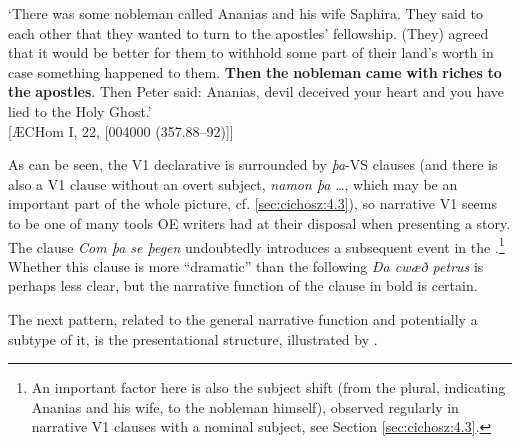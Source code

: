 \documentclass[output=paper,colorlinks,citecolor=brown]{langscibook}
\begin{document}
\glt ‘There was some nobleman called Ananias and his wife Saphira. They said to each other that they wanted to turn to the apostles' fellowship. (They) agreed that it would be better for them to withhold some part of their land's worth in case something happened to them. \textbf{Then} \textbf{the} \textbf{nobleman} \textbf{came} \textbf{with} \textbf{riches} \textbf{to} \textbf{the} \textbf{apostles}. Then Peter said: Ananias, devil deceived your heart and you have lied to the Holy Ghost.'\\ \hfill [ÆCHom I, 22, [004000 (357.88--92)]]
\z

As can be seen, the V1 declarative is surrounded by \textit{þa}-VS clauses (and there is also a V1 clause without an overt subject, \textit{namon þa} …, which may be an important part of the whole picture, cf. \ref{sec:cichosz:4.3}), so narrative V1 seems to be one of many tools OE writers had at their disposal when presenting a story. The clause \textit{Com þa se þegen} undoubtedly introduces a subsequent event in the .\footnote{An important factor here is also the subject shift (from the plural, indicating Ananias and his wife, to the nobleman himself), observed regularly in narrative V1 clauses with a nominal subject, see Section \ref{sec:cichosz:4.3}.} Whether this clause is more “dramatic” than the following \textit{Ða cwæð petrus} is perhaps less clear, but the narrative function of the clause in bold is certain.

The next pattern, related to the general narrative function and potentially a subtype of it, is the presentational structure, illustrated by .
\end{document}
